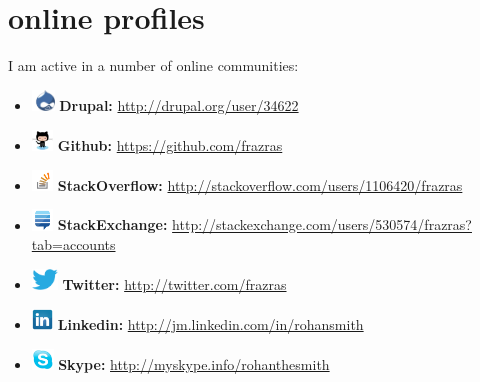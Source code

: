 \documentclass[]{friggeri-cv} %
\begin{document}
\section{online profiles}
I am active in a number of online communities:
\begin{itemize}
	\item[] \includegraphics[height=16pt]{druplicon.png} \textbf{Drupal: }\href {http://drupal.org/user/34622}{http://drupal.org/user/34622}
	\item[] \includegraphics[height=16pt]{octocat.png} \textbf{Github: }\href {https://github.com/frazras}{https://github.com/frazras}
	\item[] \includegraphics[height=16pt]{stackoverflow.png} \textbf{StackOverflow: }\href{http://stackoverflow.com/users/1106420/frazras}{http://stackoverflow.com/users/1106420/frazras}
	\item[] \includegraphics[height=16pt]{stackexchange.png} \textbf{StackExchange: } \href {http://stackexchange.com/users/530574/frazras?tab=accounts}{http://stackexchange.com/users/530574/frazras?tab=accounts}
	\item[]  \includegraphics[height=16pt]{twitter.eps}  \textbf{Twitter: }\href {http://twitter.com/frazras}{http://twitter.com/frazras}
    \item[] \includegraphics[height=16pt]{linkedin.png}  \textbf{Linkedin: }\href {http://jm.linkedin.com/in/rohansmith}{http://jm.linkedin.com/in/rohansmith}
	\item[] \includegraphics[height=16pt]{skype.png} \textbf{Skype: }\href {http://myskype.info/rohanthesmith}{http://myskype.info/rohanthesmith}
\end{itemize}
\end{document}
